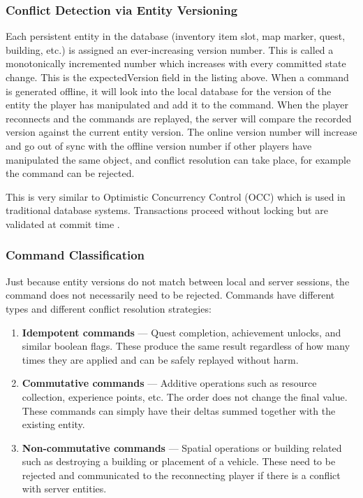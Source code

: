 \documentclass{article}
\begin{document}
\subsubsection{Conflict Detection via Entity Versioning}

Each persistent entity in the database (inventory item slot, map marker, quest, building, etc.) is assigned an ever-increasing version number. This is called a monotonically incremented number which increases with every committed state change. This is the expectedVersion field in the listing above. When a command is generated offline, it will look into the local database for the version of the entity the player has manipulated and add it to the command. When the player reconnects and the commands are replayed, the server will compare the recorded version against the current entity version. The online version number will increase and go out of sync with the offline version number if other players have manipulated the same object, and conflict resolution can take place, for example the command can be rejected.

This is very similar to Optimistic Concurrency Control (OCC) which is used in traditional database systems. Transactions proceed without locking but are validated at commit time \autocite{bernstein1981concurrency}.

\subsubsection{Command Classification}

Just because entity versions do not match between local and server sessions, the command does not necessarily need to be rejected. Commands have different types and different conflict resolution strategies:

\begin{enumerate}
  \item \textbf{Idempotent commands} — Quest completion, achievement unlocks, and similar boolean flags. These produce the same result regardless of how many times they are applied and can be safely replayed without harm.
  \item \textbf{Commutative commands} — Additive operations such as resource collection, experience points, etc. The order does not change the final value. These commands can simply have their deltas summed together with the existing entity.
  \item \textbf{Non-commutative commands} — Spatial operations or building related such as destroying a building or placement of a vehicle. These need to be rejected and communicated to the reconnecting player if there is a conflict with server entities.
\end{enumerate}
\end{document}
